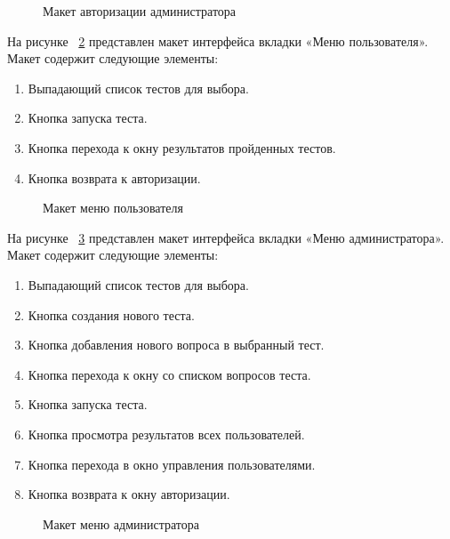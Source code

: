 \begin{figure}[H]
	\caption{Макет авторизации администратора}
	\label{admin_auth:image}
\end{figure}

На рисунке ~\ref{user_menu:image} представлен макет интерфейса вкладки «Меню пользователя». Макет содержит следующие элементы:
\begin{enumerate}
	\item Выпадающий список тестов для выбора.
	\item Кнопка запуска теста.
	\item Кнопка перехода к окну результатов пройденных тестов.
	\item Кнопка возврата к авторизации.
\end{enumerate}

\begin{figure}[H]
	\caption{Макет меню пользователя}
	\label{user_menu:image}
\end{figure}

На рисунке ~\ref{admin_menu:image} представлен макет интерфейса вкладки «Меню администратора». Макет содержит следующие элементы:
\begin{enumerate}
	\item Выпадающий список тестов для выбора.
	\item Кнопка создания нового теста.
	\item Кнопка добавления нового вопроса в выбранный тест.
	\item Кнопка перехода к окну со списком вопросов теста.
	\item Кнопка запуска теста.
	\item Кнопка просмотра результатов всех пользователей.
	\item Кнопка перехода в окно управления пользователями.
	\item Кнопка возврата к окну авторизации.
\end{enumerate}

\begin{figure}[H]
	\caption{Макет меню администратора}
	\label{admin_menu:image}
\end{figure}
